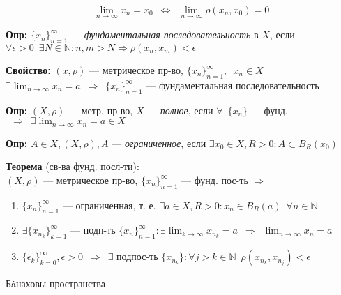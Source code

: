 \documentclass[12pt, letterpaper, twoside]{article}
\begin{document}
\vspace*{0.4cm}
\noindent
\[\lim_{n \rightarrow \infty} x_n = x_0 \enspace \Leftrightarrow \enspace \lim_{n \rightarrow \infty} \rho (x_n, x_0) = 0\]

\vspace*{0.3cm}
\noindent
\textbf{Опр:} \(\{x_n\}^{\infty}_{n = 1}\) --- \textit{фундаментальная последовательность} в \(X\), если \(\forall \epsilon > 0 \enspace \exists N \in \mathbb{N} : n, m > N \Rightarrow \rho (x_n, x_m) < \epsilon\) 
    
\vspace*{0.3cm}
\noindent
\textbf{Свойство:} \((x, \rho)\) --- метрическое пр-во, \(\{x_n\}^{\infty}_{n = 1}, \enspace x_n \in X\) \\
\(\exists \lim_{n \rightarrow \infty} x_n = a \enspace \Rightarrow \enspace \{x_n\}^{\infty}_{n = 1}\) --- фундаментальная последовательность

\vspace*{0.3cm}
\noindent
\textbf{Опр:} \((X, \rho)\) --- метр. пр-во, \(X\) --- \textit{полное}, если \(\forall \enspace \{x_n\}\) --- фунд. \(\enspace \Rightarrow \enspace \exists \lim_{n \rightarrow \infty} x_n = a \in X\)

\vspace*{0.3cm}
\noindent
\textbf{Опр:} \(A \in X, (X, \rho), A\) --- \textit{ограниченное}, если \(\exists x_0 \in X, R > 0: A \subset B_R(x_0)\)

\vspace*{0.3cm}
\noindent
\textbf{Теорема} (св-ва фунд. посл-ти): \\
\((X, \rho)\) --- метрическое пр-во, \(\{x_n\}^{\infty}_{n = 1}\) --- фунд. пос-ть \(\Rightarrow\)
\begin{enumerate}
    \item \(\{x_n\}^{\infty}_{n = 1}\) --- ограниченная, т. е. \(\exists a \in X, R > 0 : x_n \in B_R(a) \enspace \forall n \in \mathbb{N}\)
    \item \(\exists \{x_{n_k}\}^{\infty}_{k = 1}\) --- подп-ть \(\{x_n\}^{\infty}_{n = 1}: \exists \lim_{k \rightarrow \infty} x_{n_k} = a \enspace \Rightarrow \enspace \lim_{n \rightarrow \infty} x_n = a\)
    \item \(\{\epsilon_k\}^{\infty}_{k = 0}, \epsilon > 0 \enspace \Rightarrow \enspace \exists\) подпос-ть \(\{x_{n_k}\}: \forall j > k \in \mathbb{N} \enspace \rho (x_{n_k}, x_{n_j}) < \epsilon\)
\end{enumerate}

\begin{center}
    \vspace*{1.5cm}
    {\Large Б\.aнаховы пространства}
\end{center}
\end{document}
